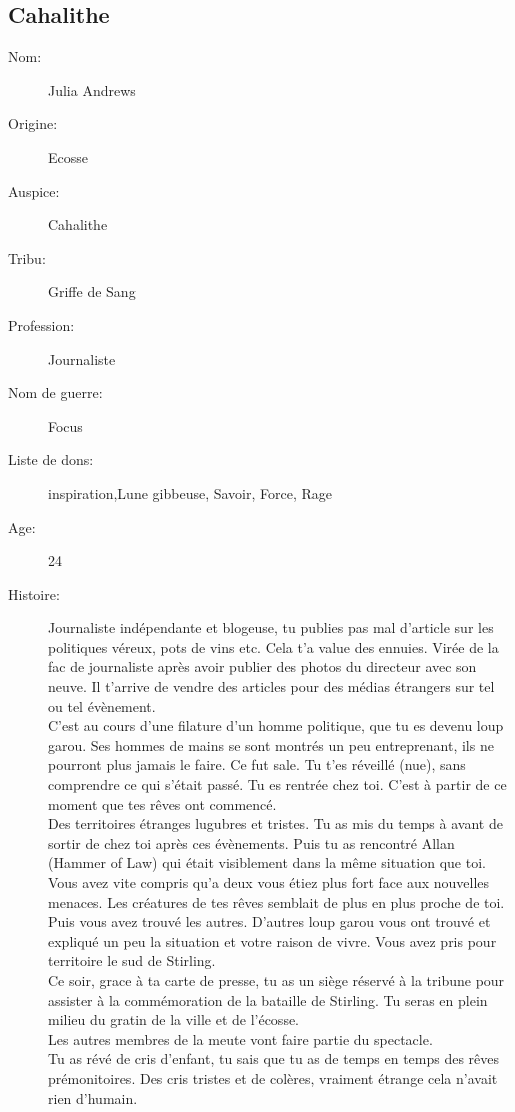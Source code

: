 \documentclass[oneside,12pt]{book}
\begin{document}
\begin{flushleft}
\section{Cahalithe}
\begin{description}
\item[Nom:]{Julia Andrews}
\item[Origine:]{Ecosse}
\item[Auspice:]{Cahalithe}
\item[Tribu:]{Griffe de Sang}
\item[Profession:]{Journaliste}
\item[Nom de guerre:]{Focus}
\item[Liste de dons:]{inspiration,Lune gibbeuse, Savoir, Force, Rage}
\item[Age:]{24}
\item[Histoire:]{
Journaliste indépendante et blogeuse, tu publies pas mal d'article sur les politiques véreux, pots de vins etc. Cela t'a value des ennuies. 
Virée de la fac de journaliste après avoir publier des photos du directeur avec son neuve. Il t'arrive de vendre des articles pour des médias étrangers sur tel ou tel évènement.\\ 
C'est au cours d'une filature d'un homme politique, que tu es devenu loup garou. Ses hommes de mains se sont montrés un peu entreprenant, ils ne pourront plus jamais le faire. Ce fut sale. Tu t'es réveillé (nue), sans comprendre ce qui s'était passé. Tu es rentrée chez toi. C'est à partir de ce moment que tes rêves ont commencé.\\
Des territoires étranges lugubres et tristes. Tu as mis du temps à avant de sortir de chez toi après ces évènements. Puis tu as rencontré Allan (Hammer of Law) qui était visiblement dans la même situation que toi.\\
Vous avez vite compris qu'a deux vous étiez plus fort face aux nouvelles menaces. Les créatures de tes rêves semblait de plus en plus proche de toi. 
Puis vous avez trouvé les autres. D'autres loup garou vous ont trouvé et expliqué un peu la situation et votre raison de vivre. Vous avez pris pour territoire le sud de Stirling. \\

Ce soir, grace à ta carte de presse, tu as un siège réservé à la tribune pour assister à la commémoration de la bataille de Stirling. Tu seras en plein milieu du gratin de la ville et de l'écosse. \\
Les autres membres de la meute vont faire partie du spectacle. \\
Tu as révé de cris d'enfant, tu sais que tu as de temps en temps des rêves prémonitoires. Des cris tristes et de colères, vraiment étrange cela n'avait rien d'humain. \\

}
\end{description}
\end{flushleft}
\end{document}
